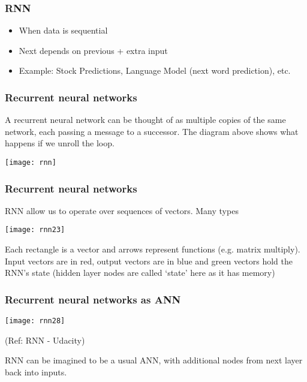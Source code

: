 \begin{frame}[fragile] \frametitle{RNN}
\begin{itemize}
\item When data is sequential
\item Next depends on previous + extra input
\item Example: Stock Predictions, Language Model (next word prediction), etc.
\end{itemize}
\end{frame}





\begin{frame}[fragile] \frametitle{Recurrent neural networks}

A recurrent neural network can be thought of as multiple copies of the same network, each passing a message to a successor. 
The diagram above shows what happens if we unroll the loop. 

\begin{center}
\texttt{[image: rnn]}
\end{center}
\end{frame}


\begin{frame}[fragile] \frametitle{Recurrent neural networks}
RNN allow us to operate over sequences of vectors. Many types
\begin{center}
\texttt{[image: rnn23]}
\end{center}
Each rectangle is a vector and arrows represent functions (e.g. matrix multiply). Input vectors are in red, output vectors are in blue and green vectors hold the RNN's state (hidden layer nodes are called `state' here as it has memory)

\end{frame}

\begin{frame}[fragile] \frametitle{Recurrent neural networks as ANN}
\begin{center}
\texttt{[image: rnn28]}

\tiny{(Ref: RNN - Udacity)}

\end{center}

RNN can be imagined to be a usual ANN, with additional nodes from next layer back into inputs.
\end{frame}



